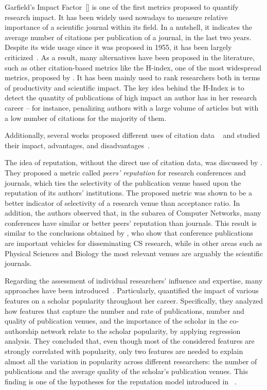\documentclass[msc]{ppgccufmg}
\begin{document}
Garfield's Impact Factor~[\citeyear{garfield1955}] is one of the first metrics proposed to quantify research impact. It has been widely used nowadays to measure relative importance of a scientific journal within its field. In a nutshell, it indicates the average number of citations per publication of a journal, in the last two years. Despite its wide usage since it was proposed in 1955, it has been largely criticized~\citep{saha2003}. As a result, many alternatives have been proposed in the literature, such as other citation-based metrics like the H-index, one of the most widespread metrics, proposed by \cite{hirsch2005}. It has been mainly used to rank researchers both in terms of productivity and scientific impact. The key idea behind the H-Index is to detect the quantity of publications of high impact an author has in her research career -- for instance, penalizing authors with a large volume of articles but with a low number of citations for the majority of them. 

Additionally, several works proposed different uses of citation data ~\citep{egghe2006theory, ding-2011, yan2011p, sun2007popularity} and studied their impact, advantages, and disadvantages~\citep{martins2009, leydesdorff2009new}.

The idea of reputation, without the direct use of citation data, was discussed by \cite{nelakuditi2011snap}. They proposed a metric called \textit{peers' reputation} for research conferences and journals, which ties the selectivity of the publication venue based upon the reputation of its authors' institutions. The proposed metric was shown to be a better indicator of selectivity of a research venue than acceptance ratio. In addition, the authors observed that, in the subarea of Computer Networks, many conferences have similar or better peers' reputation than journals. This result is similar to the conclusions obtained by \cite{laender2008}, who show that conference publications are important vehicles for disseminating CS research, while in other areas such as Physical Sciences and Biology the most relevant venues are arguably the scientific journals.

Regarding the assessment of individual researchers' influence and expertise, many approaches have been introduced~\citep{balog2012ftir, cormode2014people, deng2012modeling, gollapalli2011ranking, wu2009detecting}. Particularly, \cite{goncalves2014} quantified the impact of various features on a scholar popularity throughout her career. Specifically, they analyzed how features that capture the number and rate of publications, number and quality of publication venues, and the importance of the scholar in the co-authorship network relate to the scholar popularity, by applying regression analysis. They concluded that, even though most of the considered features are strongly correlated with popularity, only two features are needed to explain almost all the variation in popularity across different researchers: the number of publications and the average quality of the scholar’s publication venues. This finding is one of the hypotheses for the reputation model introduced in ~\citep{ribas2015random}. 
\end{document}
